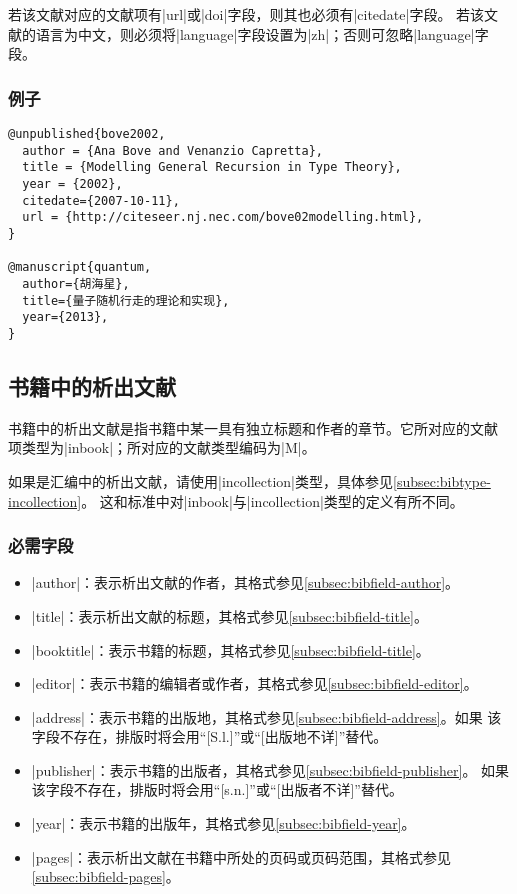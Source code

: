 \begin{note}
若该文献对应的文献项有|url|或|doi|字段，则其也必须有|citedate|字段。
若该文献的语言为中文，则必须将|language|字段设置为|zh|；否则可忽略|language|字段。
\end{note}

\subsubsection{例子}

\begin{verbatim}
@unpublished{bove2002,
  author = {Ana Bove and Venanzio Capretta},
  title = {Modelling General Recursion in Type Theory},
  year = {2002},
  citedate={2007-10-11},
  url = {http://citeseer.nj.nec.com/bove02modelling.html},
}

@manuscript{quantum,
  author={胡海星},
  title={量子随机行走的理论和实现},
  year={2013},
}
\end{verbatim}


\subsection{书籍中的析出文献}\label{subsec:bibtype-inbook}

书籍中的析出文献是指书籍中某一具有独立标题和作者的章节。它所对应的{\BibTeX}文献
项类型为|inbook|；所对应的文献类型编码为|M|\cite{gbt3469-1983}。

\begin{note}
如果是汇编中的析出文献，请使用|incollection|类型，具体参见\ref{subsec:bibtype-incollection}。
这和标准{\BibTeX}中对|inbook|与|incollection|类型的定义有所不同。
\end{note}

\subsubsection{必需字段}

\begin{itemize}
\item |author|：表示析出文献的作者，其格式参见\ref{subsec:bibfield-author}。
\item |title|：表示析出文献的标题，其格式参见\ref{subsec:bibfield-title}。
\item |booktitle|：表示书籍的标题，其格式参见\ref{subsec:bibfield-title}。
\item |editor|：表示书籍的编辑者或作者，其格式参见\ref{subsec:bibfield-editor}。
\item |address|：表示书籍的出版地，其格式参见\ref{subsec:bibfield-address}。如果
  该字段不存在，{\BibTeX}排版时将会用``[S.l.]''或``[出版地不详]''替代。
\item |publisher|：表示书籍的出版者，其格式参见\ref{subsec:bibfield-publisher}。
  如果该字段不存在，{\BibTeX}排版时将会用``[s.n.]''或``[出版者不详]''替代。
\item |year|：表示书籍的出版年，其格式参见\ref{subsec:bibfield-year}。
\item |pages|：表示析出文献在书籍中所处的页码或页码范围，其格式参见\ref{subsec:bibfield-pages}。
\end{itemize}

